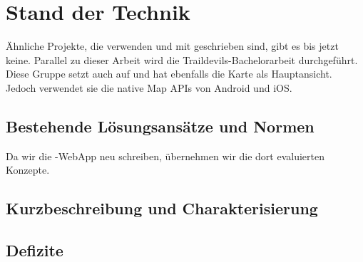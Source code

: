 \chapter{Stand der Technik}
\label{tb-stand-der-technik}
Ähnliche Projekte, die  verwenden und mit  geschrieben sind, gibt es bis jetzt keine.
Parallel zu dieser Arbeit wird die Traildevils-Bachelorarbeit durchgeführt.
Diese Gruppe setzt auch auf  und hat ebenfalls die Karte als Hauptansicht.
Jedoch verwendet sie die native Map APIs von Android und iOS.


\section{Bestehende Lösungsansätze und Normen}
Da wir die \kort{}-\gls{WebApp} neu schreiben, übernehmen wir die dort evaluierten Konzepte.

\section{Kurzbeschreibung und Charakterisierung}


\section{Defizite}

